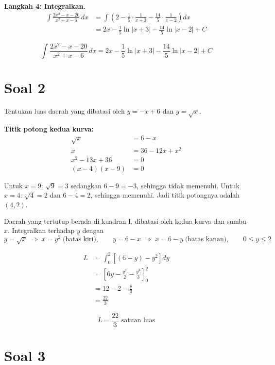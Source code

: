 \documentclass[12pt]{article}
\begin{document}
\textbf{Langkah 4: Integralkan.}
\begin{align*}
\int \frac{2x^2 - x - 20}{x^2 + x - 6}\,dx
&= \int \left( 2 - \frac{1}{5}\cdot\frac{1}{x + 3} - \frac{14}{5}\cdot\frac{1}{x - 2} \right) dx \\
&= 2x - \frac{1}{5}\ln|x + 3| - \frac{14}{5}\ln|x - 2| + C
\end{align*}

\[
\int \frac{2x^2 - x - 20}{x^2 + x - 6}\,dx = 2x - \frac{1}{5}\ln|x + 3| - \frac{14}{5}\ln|x - 2| + C
\]

\section*{Soal 2}

Tentukan luas daerah yang dibatasi oleh $y = -x + 6$ dan $y = \sqrt{x}$.

\textbf{Titik potong kedua kurva:}
\begin{align*}
\sqrt{x} &= 6 - x \\
x &= 36 - 12x + x^2 \\
x^2 - 13x + 36 &= 0 \\
(x - 4)(x - 9) &= 0
\end{align*}

Untuk $x = 9$: $\sqrt9 = 3$ sedangkan $6 - 9 = -3$, sehingga tidak memenuhi.
Untuk $x = 4$: $\sqrt4 = 2$ dan $6 - 4 = 2$, sehingga memenuhi.
Jadi titik potongnya adalah $(4, 2)$.

Daerah yang tertutup berada di kuadran I, dibatasi oleh kedua kurva dan sumbu-$x$.
Integralkan terhadap $y$ dengan
\[
y = \sqrt{x} \;\Rightarrow\; x = y^2 \;\text{(batas kiri)}, \qquad
y = 6 - x \;\Rightarrow\; x = 6 - y \;\text{(batas kanan)}, \qquad 0 \le y \le 2
\]

\begin{align*}
L &= \int_0^2 \left[(6 - y) - y^2\right] dy \\
&= \left[6y - \frac{y^2}{2} - \frac{y^3}{3}\right]_0^2 \\
&= 12 - 2 - \frac{8}{3} \\
&= \frac{22}{3}
\end{align*}

\[
L = \frac{22}{3} \text{ satuan luas}
\]

\section*{Soal 3}
\end{document}

